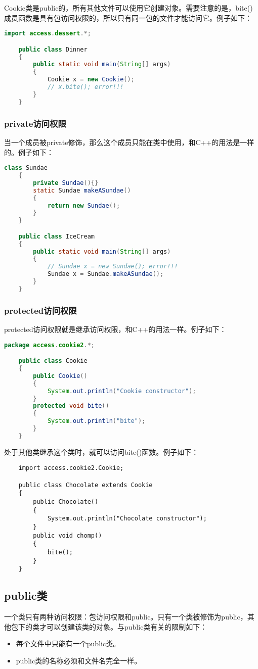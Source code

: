 \documentclass[a4paper,left=2.5cm,right=2.5cm,11pt]{article}
\begin{document}
	Cookie类是public的，所有其他文件可以使用它创建对象。需要注意的是，bite()成员函数是具有包访问权限的，所以只有同一包的文件才能访问它。例子如下：
	\begin{lstlisting}[language = Java]
	import access.dessert.*;

	public class Dinner
	{
		public static void main(String[] args)
		{
			Cookie x = new Cookie();
			// x.bite(); error!!!
		}
	}
	\end{lstlisting}

\subsubsection{private访问权限}
	当一个成员被private修饰，那么这个成员只能在类中使用，和C++的用法是一样的。例子如下：
	\begin{lstlisting}[language = Java]
	class Sundae
	{
		private Sundae(){}
		static Sundae makeASundae()
		{
			return new Sundae();
		}
	}

	public class IceCream
	{
		public static void main(String[] args)
		{
			// Sundae x = new Sundae(); error!!!
			Sundae x = Sundae.makeASundae();
		}
	}
	\end{lstlisting}

\subsubsection{protected访问权限}
	protected访问权限就是继承访问权限，和C++的用法一样。例子如下：
	\begin{lstlisting}[language = Java]
	package access.cookie2.*;

	public class Cookie
	{
		public Cookie()
		{
			System.out.println("Cookie constructor");
		}
		protected void bite()
		{
			System.out.println("bite");
		}
	}
	\end{lstlisting}

	处于其他类继承这个类时，就可以访问bite()函数。例子如下：
	\begin{lstlisting}
	import access.cookie2.Cookie;

	public class Chocolate extends Cookie
	{
		public Chocolate()
		{
			System.out.println("Chocolate constructor");
		}
		public void chomp()
		{
			bite();
		}
	}
	\end{lstlisting}

\subsection{public类}
	一个类只有两种访问权限：包访问权限和public。只有一个类被修饰为public，其他包下的类才可以创建该类的对象。与public类有关的限制如下：
	\begin{itemize}
		\item 每个文件中只能有一个public类。
		\item public类的名称必须和文件名完全一样。
	\end{itemize}
\end{document}
